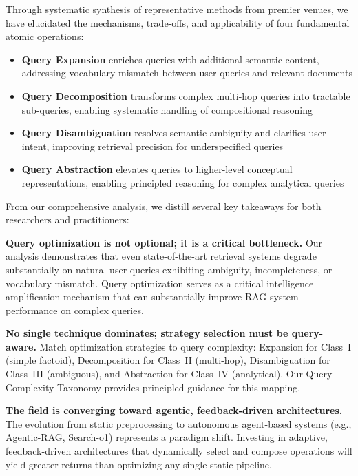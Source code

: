 \documentclass{article}
\begin{document}
Through systematic synthesis of representative methods from premier venues, we have elucidated the mechanisms, trade-offs, and applicability of four fundamental atomic operations:

\begin{itemize}[leftmargin=*,nosep]
    \item \textbf{Query Expansion} enriches queries with additional semantic content, addressing vocabulary mismatch between user queries and relevant documents
    \item \textbf{Query Decomposition} transforms complex multi-hop queries into tractable sub-queries, enabling systematic handling of compositional reasoning
    \item \textbf{Query Disambiguation} resolves semantic ambiguity and clarifies user intent, improving retrieval precision for underspecified queries
    \item \textbf{Query Abstraction} elevates queries to higher-level conceptual representations, enabling principled reasoning for complex analytical queries
\end{itemize}

From our comprehensive analysis, we distill several key takeaways for both researchers and practitioners:

\textbf{Query optimization is not optional; it is a critical bottleneck.} Our analysis demonstrates that even state-of-the-art retrieval systems degrade substantially on natural user queries exhibiting ambiguity, incompleteness, or vocabulary mismatch. Query optimization serves as a critical intelligence amplification mechanism that can substantially improve RAG system performance on complex queries.

\textbf{No single technique dominates; strategy selection must be query-aware.} Match optimization strategies to query complexity: Expansion for Class~I (simple factoid), Decomposition for Class~II (multi-hop), Disambiguation for Class~III (ambiguous), and Abstraction for Class~IV (analytical). Our Query Complexity Taxonomy provides principled guidance for this mapping.

\textbf{The field is converging toward agentic, feedback-driven architectures.} The evolution from static preprocessing to autonomous agent-based systems (e.g., Agentic-RAG, Search-o1) represents a paradigm shift. Investing in adaptive, feedback-driven architectures that dynamically select and compose operations will yield greater returns than optimizing any single static pipeline.
\end{document}
